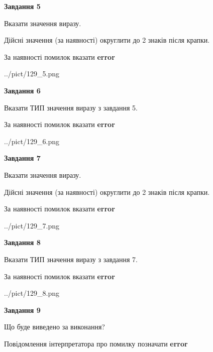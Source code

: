 \documentclass[11pt, ukrainian]{article}
\begin{document}
{\begin {large}
{\begin {center}\textbf{Завдання 5}\end {center}}\par
Вказати значення виразу. \par
Дійсні значення (за наявності) округлити до 2 знаків після крапки. \par
За наявності помилок вказати \textbf{error}

\begin{center}
	{../pict/129_5.png}
\end{center}
\newpage

{\begin {center}\textbf{Завдання 6}\end {center}}\par
Вказати ТИП значення виразу з завдання 5. \par
За наявності помилок вказати \textbf{error}

\begin{center}
	{../pict/129_6.png}
\end{center}
\newpage

{\begin {center}\textbf{Завдання 7}\end {center}}\par
Вказати значення виразу. \par
Дійсні значення (за наявності) округлити до 2 знаків після крапки. \par
За наявності помилок вказати \textbf{error}

\begin{center}
	{../pict/129_7.png}
\end{center}
\newpage

{\begin {center}\textbf{Завдання 8}\end {center}}\par
Вказати ТИП значення виразу з завдання 7. \par
За наявності помилок вказати \textbf{error}

\begin{center}
	{../pict/129_8.png}
\end{center}
\newpage

{\begin {center}\textbf{Завдання 9}\end {center}}\par
Що буде виведено за виконання? \par
Повідомлення інтерпретатора про помилку позначати \textbf{error}


\end{large}}
\end{document}

